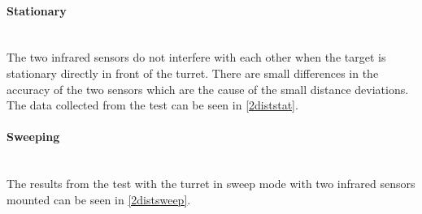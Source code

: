 \paragraph{Stationary} ~\\
The two infrared sensors do not interfere with each other when the target is stationary directly in front of the turret. There are small differences in the accuracy of the two sensors which are the cause of the small distance deviations. The data collected from the test can be seen in \cref{2diststat}.



\paragraph{Sweeping} ~\\
The results from the test with the turret in sweep mode with two infrared sensors mounted can be seen in \cref{2distsweep}. 



\eal